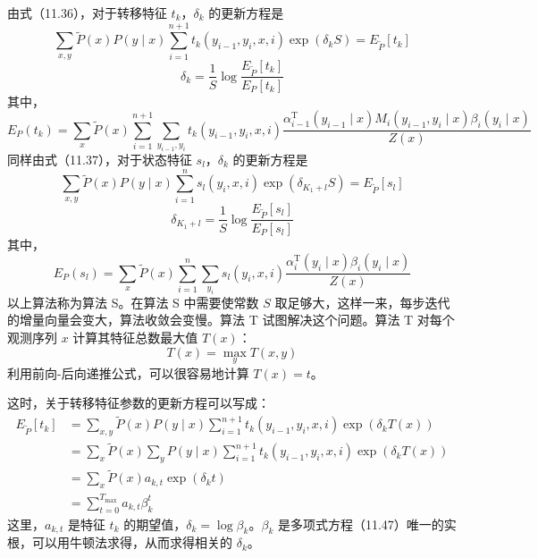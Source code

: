 \documentclass[UTF8,12pt,a4paper,fontset=fandol]{ctexart}
\begin{document}
由式（11.36），对于转移特征 $t_k$，$\delta_k$ 的更新方程是
\begin{equation}
\sum_{x,y}\tilde P(x)P(y\mid x)\sum_{i=1}^{n+1}t_k(y_{i-1},y_i,x,i)\exp(\delta_kS)=E_{\tilde P}[t_k]
\tag{11.40}
\end{equation}
\begin{equation}
\delta_k=\frac{1}{S}\log\frac{E_{\tilde P}[t_k]}{E_P[t_k]}
\tag{11.41}
\end{equation}
其中，
\begin{equation}
E_P(t_k)=\sum_x\tilde P(x)\sum_{i=1}^{n+1}\sum_{y_{i-1},y_i}
t_k(y_{i-1},y_i,x,i)
\frac{\alpha_{i-1}^{\mathrm T}(y_{i-1}\mid x)M_i(y_{i-1},y_i\mid x)\beta_i(y_i\mid x)}{Z(x)}
\tag{11.42}
\end{equation}
同样由式（11.37），对于状态特征 $s_l$，$\delta_k$ 的更新方程是
\begin{equation}
\sum_{x,y}\tilde P(x)P(y\mid x)\sum_{i=1}^{n}s_l(y_i,x,i)\exp(\delta_{K_1+l}S)=E_{\tilde P}[s_l]
\tag{11.43}
\end{equation}
\begin{equation}
\delta_{K_1+l}=\frac{1}{S}\log\frac{E_{\tilde P}[s_l]}{E_P[s_l]}
\tag{11.44}
\end{equation}
其中，
\begin{equation}
E_P(s_l)=\sum_x\tilde P(x)\sum_{i=1}^{n}\sum_{y_i}
s_l(y_i,x,i)\frac{\alpha_i^{\mathrm T}(y_i\mid x)\beta_i(y_i\mid x)}{Z(x)}
\tag{11.45}
\end{equation}
以上算法称为算法 S。在算法 S 中需要使常数 $S$ 取足够大，这样一来，每步迭代的增量向量会变大，算法收敛会变慢。算法 T 试图解决这个问题。算法 T 对每个观测序列 $x$ 计算其特征总数最大值 $T(x)$：
\begin{equation}
T(x)=\max_y T(x,y)
\tag{11.46}
\end{equation}
利用前向-后向递推公式，可以很容易地计算 $T(x)=t$。

这时，关于转移特征参数的更新方程可以写成：
\begin{equation}
\begin{aligned}
E_{\tilde P}[t_k]
&=\sum_{x,y}\tilde P(x)P(y\mid x)\sum_{i=1}^{n+1}t_k(y_{i-1},y_i,x,i)\exp(\delta_kT(x))\\
&=\sum_x\tilde P(x)\sum_yP(y\mid x)\sum_{i=1}^{n+1}t_k(y_{i-1},y_i,x,i)\exp(\delta_kT(x))\\
&=\sum_x\tilde P(x)a_{k,t}\exp(\delta_kt)\\
&=\sum_{t=0}^{T_{\max}}a_{k,t}\beta_k^t
\end{aligned}
\tag{11.47}
\end{equation}
这里，$a_{k,t}$ 是特征 $t_k$ 的期望值，$\delta_k=\log\beta_k$。$\beta_k$ 是多项式方程（11.47）唯一的实根，可以用牛顿法求得，从而求得相关的 $\delta_k$。
\end{document}
